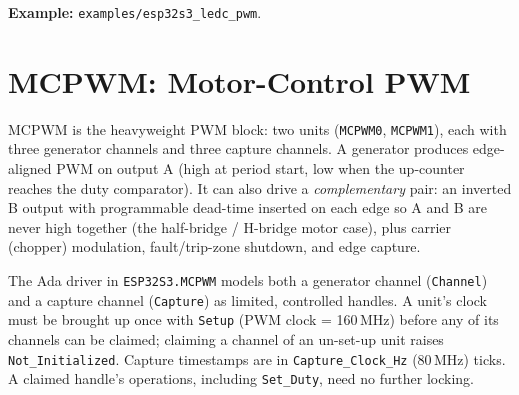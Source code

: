 \noindent\textbf{Example:} \texttt{examples/esp32s3\_ledc\_pwm}.

\section{MCPWM: Motor-Control PWM}
\label{app:int:mcpwm}

MCPWM is the heavyweight PWM block: two units (\texttt{MCPWM0}, \texttt{MCPWM1}),
each with three generator channels and three capture channels. A generator
produces edge-aligned PWM on output A (high at period start, low when the
up-counter reaches the duty comparator). It can also drive a \emph{complementary}
pair: an inverted B output with programmable dead-time inserted on each edge so
A and B are never high together (the half-bridge / H-bridge motor case), plus
carrier (chopper) modulation, fault/trip-zone shutdown, and edge capture.

The Ada driver in \texttt{ESP32S3.MCPWM} models both a generator channel
(\texttt{Channel}) and a capture channel (\texttt{Capture}) as limited, controlled
handles. A unit's clock must be brought up once with \texttt{Setup} (PWM clock =
160\,MHz) before any of its channels can be claimed; claiming a channel of an
un-set-up unit raises \texttt{Not\_Initialized}. Capture timestamps are in
\texttt{Capture\_Clock\_Hz} (80\,MHz) ticks. A claimed handle's operations,
including \texttt{Set\_Duty}, need no further locking.


